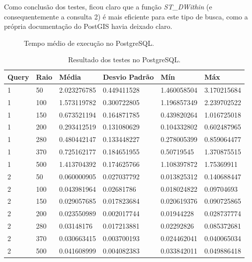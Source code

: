 \documentclass[diss]{template/setrem}
\begin{document}
Como conclusão dos testes, ficou claro que a função \emph{ST\_DWithin} (e consequentemente a consulta 2) é mais eficiente para este tipo de busca, como a própria documentação do PostGIS havia deixado claro.

\begin{figure}[!h]
    
    \caption{Tempo médio de execução no PostgreSQL.}
    \label{fig:test-postgresql}
\end{figure}



\begin{table}
  \begin{center}
  	\footnotesize
  	\renewcommand{\arraystretch}{1.5}
    \begin{tabular}{ | l | l | l | l | l | l |}
    \hline
	\textbf{Query} & \textbf{Raio} & \textbf{Média} & \textbf{Desvio Padrão} & \textbf{Mín} & \textbf{Máx} \\ \hline
	1 & 50  & 2.023276785 & 0.449411528 & 1.460058504 & 3.170215684 \\ \hline
	1 & 100 & 1.573119782 & 0.300722805 & 1.196857349 & 2.239702522 \\ \hline
	1 & 150 & 0.673521194 & 0.164871785 & 0.439820264 & 1.016725018 \\ \hline
	1 & 200 & 0.293412519 & 0.131080629 & 0.104332802 & 0.602487965 \\ \hline
	1 & 280 & 0.480442147 & 0.133448227 & 0.278005399 & 0.859064477 \\ \hline
	1 & 370 & 0.725162177 & 0.184651955 & 0.50719545  & 1.370875515 \\ \hline
	1 & 500 & 1.413704392 & 0.174625766 & 1.108397872 & 1.75369911  \\ \hline
	2 & 50  & 0.060000905 & 0.027037792 & 0.013825312 & 0.140688447 \\ \hline
	2 & 100 & 0.043981964 & 0.02681786  & 0.018024822 & 0.09704693  \\ \hline
	2 & 150 & 0.029057685 & 0.017823684 & 0.020619376 & 0.090725865 \\ \hline
	2 & 200 & 0.023550989 & 0.002017744 & 0.01944228  & 0.028737774 \\ \hline
	2 & 280 & 0.03148176  & 0.017213881 & 0.02292826  & 0.085372681 \\ \hline
	2 & 370 & 0.030663415 & 0.003700193 & 0.024462041 & 0.040065034 \\ \hline
	2 & 500 & 0.041608999 & 0.004082383 & 0.033842011 & 0.049886418 \\ \hline
    \end{tabular}
  \end{center}
  
  \caption{Resultado dos testes no PostgreSQL.}
  \label{tab:test-postgresql}
\end{table}
\end{document}
